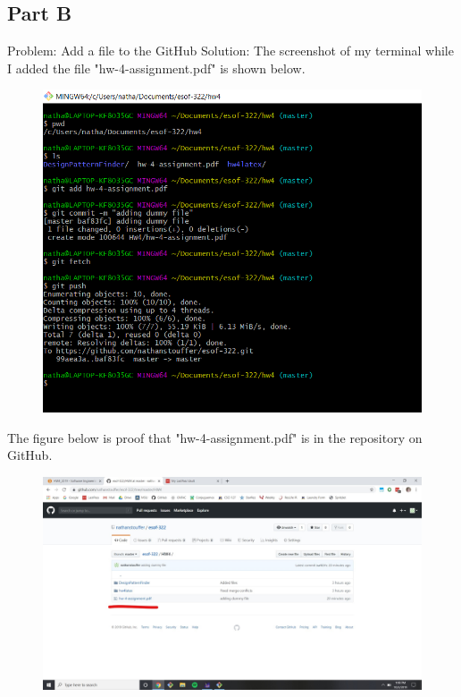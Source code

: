 \documentclass{article}
\begin{document}
\subsection*{Part B}
Problem: Add a file to the GitHub
Solution: The screenshot of my terminal while I added the file "hw-4-assignment.pdf" is shown below.
\begin{figure}[h]
	\centering
	\includegraphics[width=5in]{dummy-file.jpg}
\end{figure}
\newpage
The figure below is proof that "hw-4-assignment.pdf" is in the repository on GitHub.
\begin{figure}[h]
	\centering
	\includegraphics[width=5in]{dummy-file-on-GitHub.jpg}
\end{figure}
\end{document}
